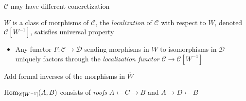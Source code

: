 \documentclass[main]{subfiles}
\begin{document}
\begin{note}
$\mathscr C$ may have different concretization
\end{note}

\begin{definition}
$W$ is a class of morphisms of $\mathscr C$, the \textit{localization} of $\mathscr C$ with respect to $W$, denoted $\mathscr C[W^{-1}]$, satisfies universal property
\begin{itemize}
\item Any functor $F:\mathscr C\to\mathscr D$ sending morphisms in $W$ to isomorphisms in $\mathscr D$ uniquely factors through the \textit{localization functor} $\mathscr C\to\mathscr C[W^{-1}]$
\end{itemize}
\end{definition}

\begin{construction}
Add formal inverses of the morphisms in $\overline W$
\end{construction}

\begin{note}
$\operatorname{Hom}_{\mathscr C[W^{-1}]}(A,B)$ consists of \textit{roofs} $A\leftarrow C\to B$ and $A\to D\leftarrow B$
\end{note}
\end{document}
